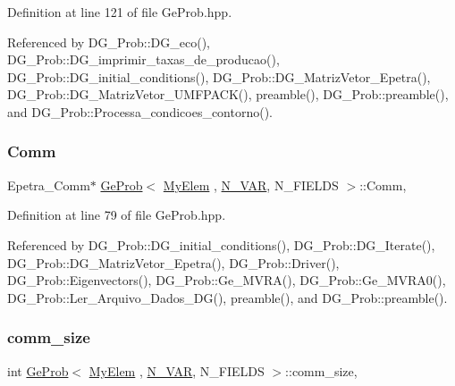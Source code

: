 Definition at line 121 of file Ge\+Prob.\+hpp.



Referenced by D\+G\+\_\+\+Prob\+::\+D\+G\+\_\+eco(), D\+G\+\_\+\+Prob\+::\+D\+G\+\_\+imprimir\+\_\+taxas\+\_\+de\+\_\+producao(), D\+G\+\_\+\+Prob\+::\+D\+G\+\_\+initial\+\_\+conditions(), D\+G\+\_\+\+Prob\+::\+D\+G\+\_\+\+Matriz\+Vetor\+\_\+\+Epetra(), D\+G\+\_\+\+Prob\+::\+D\+G\+\_\+\+Matriz\+Vetor\+\_\+\+U\+M\+F\+P\+A\+C\+K(), preamble(), D\+G\+\_\+\+Prob\+::preamble(), and D\+G\+\_\+\+Prob\+::\+Processa\+\_\+condicoes\+\_\+contorno().

\mbox{\label{classGeProb_a28a1d41fc8c294fe629b95901df8f4e3}} 
\subsubsection{\texorpdfstring{Comm}{Comm}}
{\footnotesize\ttfamily Epetra\+\_\+\+Comm$\ast$ \hyperlink{classGeProb}{Ge\+Prob}$<$ \hyperlink{DG__Prob_8h_a83cd887ced9a6587428f267e50cd4787}{My\+Elem} , \hyperlink{classED__Prob_a4e7d2ff1a8e435e336fb00c527224b5a}{N\+\_\+\+V\+AR}, N\+\_\+\+F\+I\+E\+L\+DS $>$\+::Comm\hspace{0.3cm}{\ttfamily [protected]}, {\ttfamily [inherited]}}



Definition at line 79 of file Ge\+Prob.\+hpp.



Referenced by D\+G\+\_\+\+Prob\+::\+D\+G\+\_\+initial\+\_\+conditions(), D\+G\+\_\+\+Prob\+::\+D\+G\+\_\+\+Iterate(), D\+G\+\_\+\+Prob\+::\+D\+G\+\_\+\+Matriz\+Vetor\+\_\+\+Epetra(), D\+G\+\_\+\+Prob\+::\+Driver(), D\+G\+\_\+\+Prob\+::\+Eigenvectors(), D\+G\+\_\+\+Prob\+::\+Ge\+\_\+\+M\+V\+R\+A(), D\+G\+\_\+\+Prob\+::\+Ge\+\_\+\+M\+V\+R\+A0(), D\+G\+\_\+\+Prob\+::\+Ler\+\_\+\+Arquivo\+\_\+\+Dados\+\_\+\+D\+G(), preamble(), and D\+G\+\_\+\+Prob\+::preamble().

\mbox{\label{classGeProb_ab5aa970c9864597a442bfc8519352730}} 
\subsubsection{\texorpdfstring{comm\+\_\+size}{comm\_size}}
{\footnotesize\ttfamily int \hyperlink{classGeProb}{Ge\+Prob}$<$ \hyperlink{DG__Prob_8h_a83cd887ced9a6587428f267e50cd4787}{My\+Elem} , \hyperlink{classED__Prob_a4e7d2ff1a8e435e336fb00c527224b5a}{N\+\_\+\+V\+AR}, N\+\_\+\+F\+I\+E\+L\+DS $>$\+::comm\+\_\+size\hspace{0.3cm}{\ttfamily [protected]}, {\ttfamily [inherited]}}



